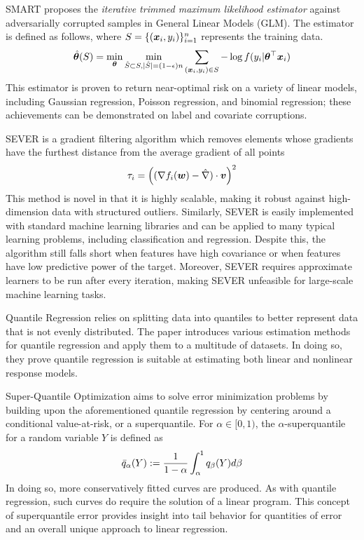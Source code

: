 \documentclass{article} %
\begin{document}
	SMART \cite{https://doi.org/10.48550/arxiv.2206.04777} proposes the \textit{iterative trimmed maximum likelihood estimator} against adversarially corrupted samples in General Linear Models (GLM). The estimator is defined as follows, where $S = \{({\bm{x}}_i,y_i)\}_{i=1}^n$ represents the training data. \vspace{1em}
	\begin{equation}
		\hat{{\bm{\theta}}}(S) = \min_{{\bm{\theta}}} \min_{\hat{S} \subset S, |\hat{S}| = (1-{\epsilon})n} \sum_{({\bm{x}}_i,y_i) \in S} -\log f(y_i|{\bm{\theta}}^\top{\bm{x}}_i)
	\end{equation}
	This estimator is proven to return near-optimal risk on a variety of linear models, including Gaussian regression, Poisson regression, and binomial regression; these achievements can be demonstrated on label and covariate corruptions.
	
	
	SEVER \cite{DiakonikolasKKLSS19} is a gradient filtering algorithm which removes elements whose gradients have the furthest distance from the average gradient of all points
	\begin{equation}
		\tau_i = \left((\nabla f_i({\bm{w}}) - \hat{\nabla})\cdot {\bm{v}}\right)^2
	\end{equation}
	This method is novel in that it is highly scalable, making it robust against high-dimension data with structured outliers. Similarly, SEVER is easily implemented with standard machine learning libraries and can be applied to many typical learning problems, including classification and regression. Despite this, the algorithm still falls short when features have high covariance or when features have low predictive power of the target. Moreover, SEVER requires approximate learners to be run after every iteration, making SEVER unfeasible for large-scale machine learning tasks. 
	
	Quantile Regression \cite{yu_quantile_2003} relies on splitting data into quantiles to better represent data that is not evenly distributed. The paper introduces various estimation methods for quantile regression and apply them to a multitude of datasets. In doing so, they prove quantile regression is suitable at estimating both linear and nonlinear response models.
	
	Super-Quantile Optimization \cite{ROCKAFELLAR2014140} aims to solve error minimization problems by building upon the aforementioned quantile regression by centering around a conditional value-at-risk, or a superquantile. For $\alpha \in [0,1)$, the $\alpha$-superquantile for a random variable $Y$ is defined as \begin{equation}
		\Bar{q}_\alpha (Y) := \frac{1}{1-\alpha} \int_\alpha^1 q_\beta (Y) d\beta
	\end{equation}
	In doing so, more conservatively fitted curves are produced. As with quantile regression, such curves do require the solution of a linear program.
	This concept of superquantile error provides insight into tail behavior for quantities of error and an overall unique approach to linear regression.
	
\end{document}
